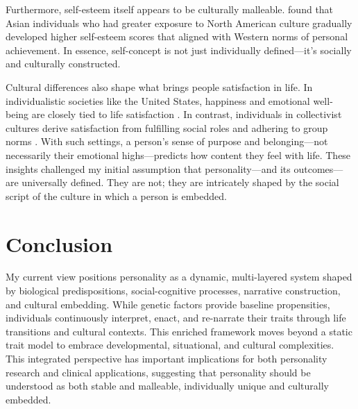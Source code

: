 \documentclass[stu]{apa7}
\begin{document}
Furthermore, self-esteem itself appears to be culturally malleable. \textcite{heine1999is} found that Asian individuals who had greater exposure to North American culture gradually developed higher self-esteem scores that aligned with Western norms of personal achievement. In essence, self-concept is not just individually defined—it’s socially and culturally constructed.

Cultural differences also shape what brings people satisfaction in life. In individualistic societies like the United States, happiness and emotional well-being are closely tied to life satisfaction \parencite{diener1995cross}. In contrast, individuals in collectivist cultures derive satisfaction from fulfilling social roles and adhering to group norms
\parencite{oishi2007dynamics,steger2008meaningful}. With such settings, a person’s sense of purpose and belonging—not necessarily their emotional highs—predicts how content they feel with life. These insights challenged my initial assumption that personality—and its outcomes—are universally defined. They are not; they are intricately shaped by the social script of the culture in which a person is embedded.

\section{Conclusion}

My current view positions personality as a dynamic, multi-layered system shaped by biological predispositions, social-cognitive processes, narrative construction, and cultural embedding. While genetic factors provide baseline propensities, individuals continuously interpret, enact, and re-narrate their traits through life transitions and cultural contexts. This enriched framework moves beyond a static trait model to embrace developmental, situational, and cultural complexities. This integrated perspective has important implications for both personality research and clinical applications, suggesting that personality should be understood as both stable and malleable, individually unique and culturally embedded.


\printbibliography
\end{document}
